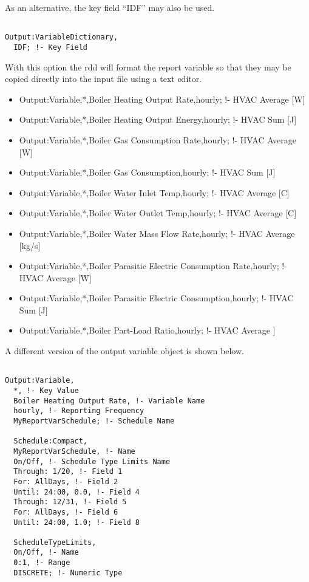 As an alternative, the key field ``IDF'' may also be used.

\begin{lstlisting}

Output:VariableDictionary,
  IDF; !- Key Field
\end{lstlisting}

With this option the rdd will format the report variable so that they may be copied directly into the input file using a text editor.

\begin{itemize}
\tightlist
\item
  Output:Variable,*,Boiler Heating Output Rate,hourly; !- HVAC Average {[}W{]}
\item
  Output:Variable,*,Boiler Heating Output Energy,hourly; !- HVAC Sum {[}J{]}
\item
  Output:Variable,*,Boiler Gas Consumption Rate,hourly; !- HVAC Average {[}W{]}
\item
  Output:Variable,*,Boiler Gas Consumption,hourly; !- HVAC Sum {[}J{]}
\item
  Output:Variable,*,Boiler Water Inlet Temp,hourly; !- HVAC Average {[}C{]}
\item
  Output:Variable,*,Boiler Water Outlet Temp,hourly; !- HVAC Average {[}C{]}
\item
  Output:Variable,*,Boiler Water Mass Flow Rate,hourly; !- HVAC Average {[}kg/s{]}
\item
  Output:Variable,*,Boiler Parasitic Electric Consumption Rate,hourly; !- HVAC Average {[}W{]}
\item
  Output:Variable,*,Boiler Parasitic Electric Consumption,hourly; !- HVAC Sum {[}J{]}
\item
  Output:Variable,*,Boiler Part-Load Ratio,hourly; !- HVAC Average {]}
\end{itemize}

A different version of the output variable object is shown below.

\begin{lstlisting}

Output:Variable,
  *, !- Key Value
  Boiler Heating Output Rate, !- Variable Name
  hourly, !- Reporting Frequency
  MyReportVarSchedule; !- Schedule Name

  Schedule:Compact,
  MyReportVarSchedule, !- Name
  On/Off, !- Schedule Type Limits Name
  Through: 1/20, !- Field 1
  For: AllDays, !- Field 2
  Until: 24:00, 0.0, !- Field 4
  Through: 12/31, !- Field 5
  For: AllDays, !- Field 6
  Until: 24:00, 1.0; !- Field 8

  ScheduleTypeLimits,
  On/Off, !- Name
  0:1, !- Range
  DISCRETE; !- Numeric Type
\end{lstlisting}

